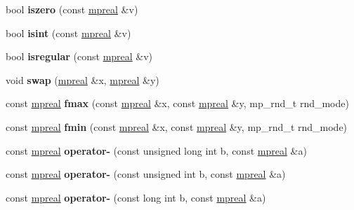 \begin{DoxyCompactItemize}
bool {\bfseries iszero} (const \hyperlink{classmpfr_1_1mpreal}{mpreal} \&v)
\item 
\mbox{\label{classmpfr_1_1mpreal_aa71f5e9cfce9c94c285bf7e2be87df9c}} 
bool {\bfseries isint} (const \hyperlink{classmpfr_1_1mpreal}{mpreal} \&v)
\item 
\mbox{\label{classmpfr_1_1mpreal_aab30c989272836557b19153ccc190835}} 
bool {\bfseries isregular} (const \hyperlink{classmpfr_1_1mpreal}{mpreal} \&v)
\item 
\mbox{\label{classmpfr_1_1mpreal_abe1580967102f81bd80296c994d72291}} 
void {\bfseries swap} (\hyperlink{classmpfr_1_1mpreal}{mpreal} \&x, \hyperlink{classmpfr_1_1mpreal}{mpreal} \&y)
\item 
\mbox{\label{classmpfr_1_1mpreal_a5be6da7887c64b9b21b85eaf8d59413a}} 
const \hyperlink{classmpfr_1_1mpreal}{mpreal} {\bfseries fmax} (const \hyperlink{classmpfr_1_1mpreal}{mpreal} \&x, const \hyperlink{classmpfr_1_1mpreal}{mpreal} \&y, mp\+\_\+rnd\+\_\+t rnd\+\_\+mode)
\item 
\mbox{\label{classmpfr_1_1mpreal_ac0048f8d05e51456ab39ec5e8e19b9e4}} 
const \hyperlink{classmpfr_1_1mpreal}{mpreal} {\bfseries fmin} (const \hyperlink{classmpfr_1_1mpreal}{mpreal} \&x, const \hyperlink{classmpfr_1_1mpreal}{mpreal} \&y, mp\+\_\+rnd\+\_\+t rnd\+\_\+mode)
\item 
\mbox{\label{classmpfr_1_1mpreal_a3347590a0de2e8f7df8ff0084b2242e9}} 
const \hyperlink{classmpfr_1_1mpreal}{mpreal} {\bfseries operator-\/} (const unsigned long int b, const \hyperlink{classmpfr_1_1mpreal}{mpreal} \&a)
\item 
\mbox{\label{classmpfr_1_1mpreal_ad513898c3773f0ae461f2ffe2aad4538}} 
const \hyperlink{classmpfr_1_1mpreal}{mpreal} {\bfseries operator-\/} (const unsigned int b, const \hyperlink{classmpfr_1_1mpreal}{mpreal} \&a)
\item 
\mbox{\label{classmpfr_1_1mpreal_a8cd85c8d1019736dbc5190a63a2f9f90}} 
const \hyperlink{classmpfr_1_1mpreal}{mpreal} {\bfseries operator-\/} (const long int b, const \hyperlink{classmpfr_1_1mpreal}{mpreal} \&a)

\end{DoxyCompactItemize}
